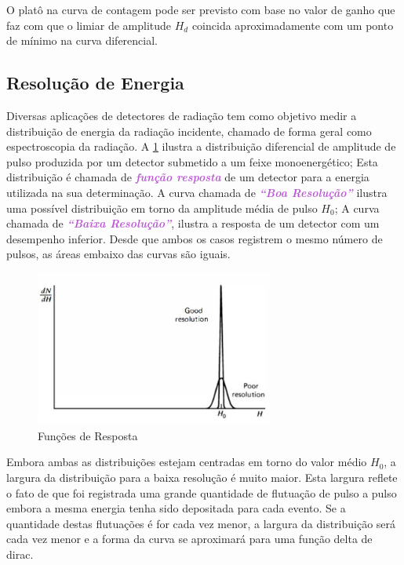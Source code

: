 \documentclass[11pt,a4paper]{article}
\begin{document}
	O platô na curva de contagem pode ser previsto com base no valor de ganho que faz com que o limiar de amplitude $H_d$ coincida aproximadamente com um ponto de mínimo na curva diferencial. 


\subsection*{Resolução de Energia}

	Diversas aplicações de detectores de radiação tem como objetivo medir a distribuição de energia da radiação incidente, chamado de forma geral como espectroscopia da radiação. A  \ref{fig:funcoesDeResposta} ilustra a distribuição diferencial de amplitude de pulso produzida por um detector submetido a um feixe monoenergético; Esta distribuição é chamada de \textcolor{MediumOrchid}{\textit{\textbf{função resposta}}} de um detector para a energia utilizada na sua determinação. A curva chamada de \textcolor{MediumOrchid}{\textit{\textbf{``Boa Resolução''}}} ilustra uma possível distribuição em torno da amplitude média de pulso $H_0$; A curva chamada de \textcolor{MediumOrchid}{\textit{\textbf{``Baixa Resolução''}}}, ilustra a resposta de um detector com um desempenho inferior. Desde que ambos os casos registrem o mesmo número de pulsos, as áreas embaixo das curvas são iguais.

		\begin{figure}[h]
			\centering
			\includegraphics[width=0.7\textwidth]{Imagens/funcoesDeResposta.jpg}
			\caption{Funções de Resposta}
			\label{fig:funcoesDeResposta}
		\end{figure}

	Embora ambas as distribuições estejam centradas em torno do valor médio $H_0$, a largura da distribuição para a baixa resolução é muito maior. Esta largura reflete o fato de que foi registrada uma grande quantidade de flutuação de pulso a pulso embora a mesma energia tenha sido depositada para cada evento. Se a quantidade destas flutuações é for cada vez menor, a largura da distribuição será cada vez menor e a forma da curva se aproximará para uma função delta de dirac. 
\end{document}
